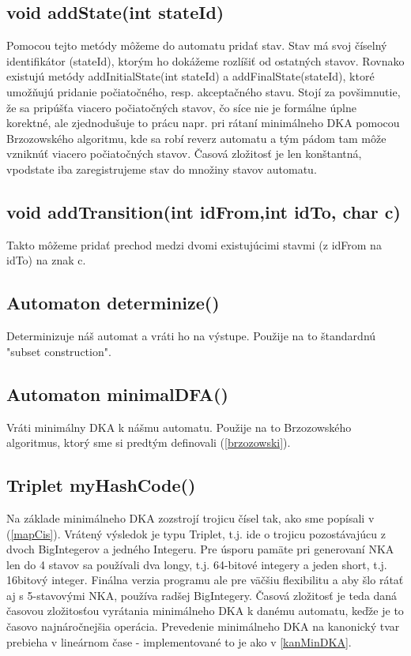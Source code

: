 \subsection*{void addState(int stateId)}
Pomocou tejto metódy môžeme do automatu pridať stav. Stav má svoj číselný identifikátor (stateId), ktorým ho dokážeme rozlíšiť od ostatných stavov. Rovnako existujú metódy addInitialState(int stateId) a addFinalState(stateId), ktoré umožňujú pridanie počiatočného, resp. akceptačného stavu. Stojí za povšimnutie, že sa pripúšťa viacero počiatočných stavov, čo síce nie je formálne úplne korektné, ale zjednodušuje to prácu napr. pri rátaní minimálneho DKA pomocou Brzozowského algoritmu, kde sa robí reverz automatu a tým pádom tam môže vzniknúť viacero počiatočných stavov. Časová zložitosť je len konštantná, vpodstate iba zaregistrujeme stav do množiny stavov automatu.

\subsection*{void addTransition(int idFrom,int idTo, char c)}
Takto môžeme pridať prechod medzi dvomi existujúcimi stavmi (z idFrom na idTo) na znak c.

\subsection*{Automaton determinize()}
Determinizuje náš automat a vráti ho na výstupe. Použije na to štandardnú "subset construction".

\subsection*{Automaton minimalDFA()}
Vráti minimálny DKA k nášmu automatu. Použije na to Brzozowského algoritmus, ktorý sme si predtým definovali (\ref{brzozowski}).

\subsection*{Triplet myHashCode()}
Na základe minimálneho DKA zozstrojí trojicu čísel tak, ako sme popísali v (\ref{mapCis}). Vrátený výsledok je typu Triplet, t.j. ide o trojicu pozostávajúcu z dvoch BigIntegerov a jedného Integeru. Pre úsporu pamäte pri generovaní NKA len do 4 stavov sa používali dva longy, t.j. 64-bitové integery a jeden short, t.j. 16bitový integer. Finálna verzia programu ale pre väčšiu flexibilitu a aby šlo rátať aj s 5-stavovými NKA, používa radšej BigIntegery. Časová zložitosť je teda daná časovou zložitosťou vyrátania minimálneho DKA k danému automatu, keďže je to časovo najnáročnejšia operácia. Prevedenie minimálneho DKA na kanonický tvar prebieha v lineárnom čase - implementované to je ako v \ref{kanMinDKA}.

